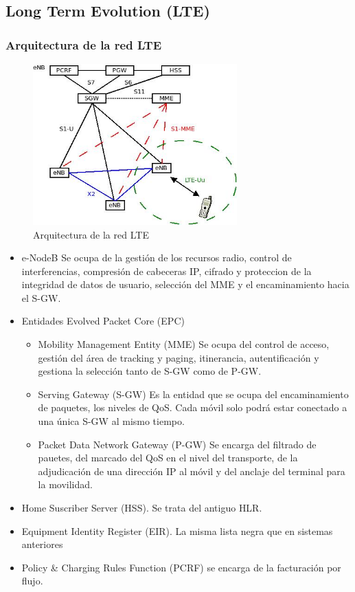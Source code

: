 \subsection{Long Term Evolution (\acrshort{LTE})}
\label{sub:LTE}
	\subsubsection{Arquitectura de la red \acrshort{LTE}}
	\label{ssub:arquiLTE}
		\begin{figure}[htp]
			\centering
			\includegraphics[width=0.7\textwidth]{Imagen/diaLTE.jpg}
			\caption{Arquitectura de la red \acrshort{LTE}}
		\end{figure}
		\begin{itemize}
			\item e-NodeB Se ocupa de la gestión de los recursos radio, control de interferencias, compresión de cabeceras IP, cifrado y proteccion de la integridad de datos de usuario, selección del \acrshort{MME} y el encaminamiento hacia el \acrshort{S-GW}.
			\item Entidades Evolved Packet Core (\acrshort{EPC})
			\begin{itemize}
				\item Mobility Management Entity (\acrshort{MME}) Se ocupa del control de acceso, gestión del área de tracking y paging, itinerancia, autentificación y gestiona la selección tanto de \acrshort{S-GW} como de \acrshort{P-GW}.
				\item Serving Gateway (\acrshort{S-GW}) Es la entidad que se ocupa del encaminamiento de paquetes, los niveles de QoS. Cada móvil solo podrá estar conectado a una única \acrshort{S-GW} al mismo tiempo.
				\item Packet Data Network Gateway (\acrshort{P-GW}) Se encarga del filtrado de pauetes, del marcado del QoS en el nivel del transporte, de la adjudicación de una dirección IP al móvil y del anclaje del terminal para la movilidad.
			\end{itemize}
			\item Home Suscriber Server (\acrshort{HSS}). Se trata del antiguo \acrshort{HLR}.
			\item Equipment Identity Register (\acrshort{EIR}). La misma lista negra que en sistemas anteriores
			\item Policy \& Charging Rules Function (\acrshort{PCRF}) se encarga de la facturación por flujo.
		\end{itemize}
